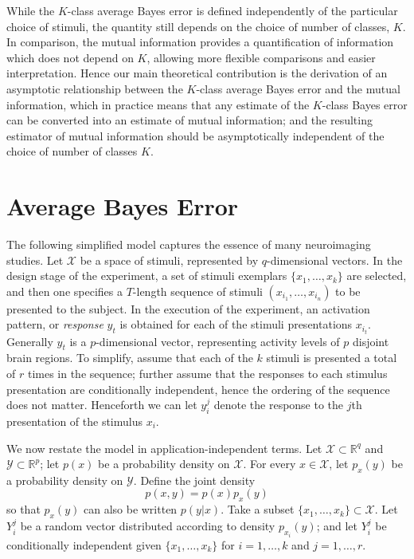 \documentclass[12pt]{article}
\begin{document}
While the $K$-class average Bayes error is defined independently of the particular choice of stimuli,
the quantity still depends on the choice of number of classes, $K$.
In comparison, the mutual information provides a quantification of information which does not depend on $K$,
allowing more flexible comparisons and easier interpretation.
Hence our main theoretical contribution is the derivation of an asymptotic relationship between the $K$-class average Bayes error
and the mutual information, which in practice means that any estimate of the $K$-class Bayes error can be converted into an estimate of mutual information;
and the resulting estimator of mutual information should be asymptotically independent of the choice of number of classes $K$.

\section{Average Bayes Error}

The following simplified model captures the essence of many neuroimaging studies.
Let $\mathcal{X}$ be a space of stimuli, represented by $q$-dimensional vectors.
In the design stage of the experiment, a set of stimuli exemplars $\{x_1,\hdots, x_k\}$ are selected,
and then one specifies a $T$-length sequence of stimuli $( x_{i_1},\hdots, x_{i_n} )$ to be presented to the subject.
In the execution of the experiment, an activation pattern, or \emph{response} $y_t$ is obtained for each of the stimuli presentations $x_{i_t}$.
Generally $y_t$ is a $p$-dimensional vector, representing activity levels of $p$ disjoint brain regions.
To simplify, assume that each of the $k$ stimuli is presented a total of $r$ times in the sequence;
further assume that the responses to each stimulus presentation are conditionally independent, hence the ordering of the sequence does not matter.
Henceforth we can let $y_i^j$ denote the response to the $j$th presentation of the stimulus $x_i$.

We now restate the model in application-independent terms.  Let $\mathcal{X} \subset \mathbb{R}^q$ and $\mathcal{Y} \subset \mathbb{R}^p$;
let $p(x)$ be a probability density on $\mathcal{X}$.  For every $x \in \mathcal{X}$, let $p_x(y)$ be a probability density on $\mathcal{Y}$.
Define the joint density
\[
p(x, y) = p(x) p_x(y)
\]
so that $p_x(y)$ can also be written $p(y|x)$.
Take a  subset $\{x_1,\hdots, x_k\} \subset \mathcal{X}$.  Let $Y_i^j$ be a random vector distributed according to density $p_{x_i}(y)$;
and let $Y_i^j$ be conditionally independent given $\{x_1,\hdots, x_k\}$ for $i = 1,\hdots, k$ and $j = 1, \hdots, r.$
 
\end{document}
